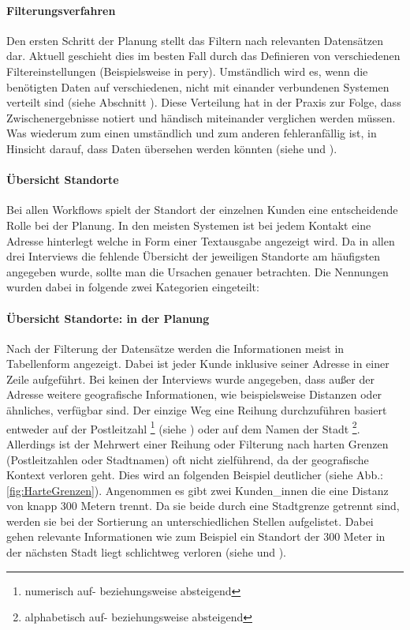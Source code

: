 \documentclass[Bachelorarbeit.tex]{subfiles}
\begin{document}
\paragraph{Filterungsverfahren}
\label{interviewsAnalyseFilterungsverfahren}
Den ersten Schritt der Planung stellt das Filtern nach relevanten Datensätzen dar.
Aktuell geschieht dies im besten Fall durch das Definieren von verschiedenen Filtereinstellungen (Beispielsweise in pery).
Umständlich wird es, wenn die benötigten Daten auf verschiedenen, nicht mit einander verbundenen Systemen verteilt sind (siehe Abschnitt ). 
Diese Verteilung hat in der Praxis zur Folge, dass Zwischenergebnisse notiert und händisch miteinander verglichen werden müssen.
Was wiederum zum einen umständlich und zum anderen fehleranfällig ist, in Hinsicht darauf, dass Daten übersehen werden könnten (siehe  und ).
\\ [1.0cm]

\paragraph*{Übersicht Standorte}
\label{interviewsAnalyseStandorte}
Bei allen Workflows spielt der Standort der einzelnen Kunden eine entscheidende Rolle bei der Planung.
In den meisten Systemen ist bei jedem Kontakt eine Adresse hinterlegt welche in Form einer Textausgabe angezeigt wird.
Da in allen drei Interviews die fehlende Übersicht der jeweiligen Standorte am häufigsten angegeben wurde, sollte man die Ursachen genauer betrachten. 
Die Nennungen wurden dabei in folgende zwei Kategorien eingeteilt:

\paragraph{Übersicht Standorte: in der Planung}
\label{UebersichtStandortePlanung}
Nach der Filterung der Datensätze werden die Informationen meist in Tabellenform angezeigt.
Dabei ist jeder Kunde inklusive seiner Adresse in einer Zeile aufgeführt.
Bei keinen der Interviews wurde angegeben, dass außer der Adresse weitere geografische Informationen, wie beispielsweise Distanzen oder ähnliches, verfügbar sind.
Der einzige Weg eine Reihung durchzuführen basiert entweder auf der Postleitzahl
\footnote{
	numerisch auf- beziehungsweise absteigend
	} 
(siehe ) oder auf dem Namen der Stadt
\footnote{
	alphabetisch auf- beziehungsweise absteigend
	}. 
Allerdings ist der Mehrwert einer Reihung oder Filterung nach harten Grenzen (Postleitzahlen oder Stadtnamen) oft nicht zielführend, da der geografische Kontext verloren geht.
Dies wird an folgenden Beispiel deutlicher (siehe Abb.: \ref{fig:HarteGrenzen}). 
Angenommen es gibt zwei Kunden\_innen die eine Distanz von knapp 300 Metern trennt. 
Da sie beide durch eine Stadtgrenze getrennt sind, werden sie bei der Sortierung an unterschiedlichen Stellen aufgelistet.
Dabei gehen relevante Informationen wie zum Beispiel ein Standort der 300 Meter in der nächsten Stadt liegt schlichtweg verloren (siehe  und ). 
 
\end{document}
